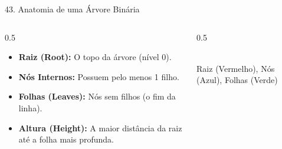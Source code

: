 \documentclass[9pt]{beamer}
\begin{document}
    \begin{frame}{43. Anatomia de uma Árvore Binária}
        \begin{columns}
            \begin{column}{0.5\textwidth}
                \begin{itemize}
                    \item \textbf{Raiz (Root):} O topo da árvore (nível 0).
                    \item \textbf{Nós Internos:} Possuem pelo menos 1 filho.
                    \item \textbf{Folhas (Leaves):} Nós sem filhos (o fim da linha).
                    \item \textbf{Altura (Height):} A maior distância da raiz até a folha mais profunda.
                \end{itemize}
            \end{column}
            \begin{column}{0.5\textwidth}
                \centering
                \\
                \vspace{0.2cm}
                \tiny Raiz (Vermelho), Nós (Azul), Folhas (Verde)
            \end{column}
        \end{columns}
    \end{frame}
\end{document}
